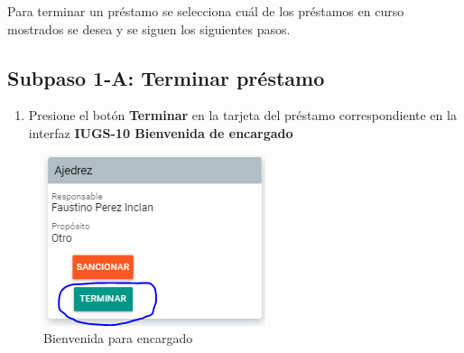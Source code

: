 Para terminar un préstamo se selecciona cuál de los préstamos en curso mostrados se desea y se siguen los siguientes pasos.
\subsection{Subpaso 1-A: Terminar préstamo}
\begin{enumerate}
	\item Presione el botón \textbf{Terminar} en la tarjeta del préstamo 
		correspondiente en la interfaz 
		\textbf{IUGS-10 Bienvenida de encargado}
\end{enumerate}
	\begin{figure}[hbtp]
		\centering
		\includegraphics[scale=0.3]{images/InterfazMovil/IUGS06_terminarPrestamo.png}
		\caption{Bienvenida para encargado}
	\end{figure}